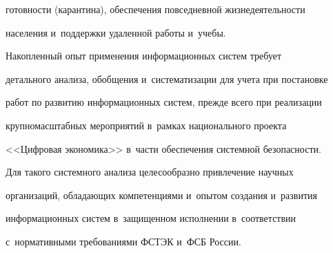 готовности (карантина), обеспечения повседневной жизнедеятельности 


населения и~поддержки удаленной работы и~учебы.


  


   Накопленный опыт применения информационных систем требует 


детального анализа, обобщения и~систематизации для учета при постановке 


работ по развитию информационных систем, прежде всего при реализации 


крупномасштабных мероприятий в~рамках национального проекта 


<<Цифровая экономика>> в~части обеспечения системной безопасности. 


  


  Для такого системного анализа целесообразно привлечение научных 


организаций, обладающих компетенциями и~опытом создания и~развития 


информационных систем в~защищенном исполнении в~соответствии 


с~нормативными требованиями ФСТЭК и~ФСБ России. 





